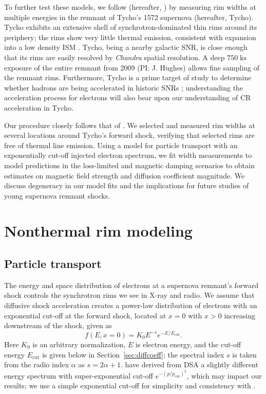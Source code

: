 \documentclass[manuscript]{aastex}  %
\newcommand*{\mt}{\mathrm}
\newcommand*{\unit}[1]{\;\mt{#1}}  %
\newcommand*{\Ecut}{E_{\mt{cut}}}
\begin{document}
To further test these models, we follow \citet{ressler2014} (hereafter,
) by measuring rim widths at multiple energies in the
remnant of Tycho's 1572 supernova (hereafter, Tycho).  Tycho exhibits an
extensive shell of synchrotron-dominated thin rims around its periphery; the
rims show very little thermal emission, consistent with expansion into a low
density ISM \citep{williams2013}.  Tycho, being a nearby galactic SNR, is close
enough that its rims are easily resolved by \textit{Chandra} spatial
resolution. A deep $750 \unit{ks}$ exposure of the entire remnant from 2009
(PI: J. Hughes) allows fine sampling of the remnant rims.  Furthermore, Tycho
is a prime target of study to determine whether hadrons are being accelerated
in historic SNRs \citep[and references therein]{morlino2012}; understanding the
acceleration process for electrons will also bear upon our understanding of CR
acceleration in Tycho.

Our procedure closely follows that of .
We selected and measured rim widths at several locations around Tycho's forward
shock, verifying that selected rims are free of thermal line emission.  Using a
model for particle transport with an exponentially cut-off injected electron
spectrum, we fit width measurements to model predictions in the loss-limited
and magnetic damping scenarios to obtain estimates on magnetic field strength
and diffusion coefficient magnitude.  We discuss degeneracy in our model fits
and the implications for future studies of young supernova remnant shocks.

\section{Nonthermal rim modeling}\label{sec:models}

\subsection{Particle transport}\label{sec:transport}

The energy and space distribution of electrons at a supernova remnant's forward
shock controls the synchrotron rims we see in X-ray and radio.  We assume that
diffusive shock acceleration creates a power-law distribution of electrons with
an exponential cut-off at the forward shock, located at $x = 0$ with $x > 0$
increasing downstream of the shock, given as
\begin{equation}
    f(E, x=0) = K_0 E^{-s} e^{-E/\Ecut} .
\end{equation}
Here $K_0$ is an arbitrary normalization, $E$ is electron energy, and the
cut-off energy $\Ecut$ is given below in Section~\ref{sec:diffcoeff}; the
spectral index $s$ is taken from the radio index $\alpha$ as $s = 2\alpha + 1$.
\citet{zirakashvili2007} have derived from DSA a slightly different energy
spectrum with super-exponential cut-off $e^{-(p/p_{\mt{cut}})^2}$, which may
impact our results; we use a simple exponential cut-off for simplicity and
consistency with .
\end{document}

